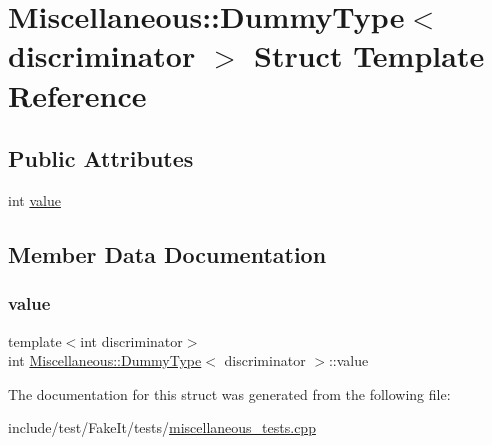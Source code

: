 \hypertarget{structMiscellaneous_1_1DummyType}{}\section{Miscellaneous\+::Dummy\+Type$<$ discriminator $>$ Struct Template Reference}
\label{structMiscellaneous_1_1DummyType}
\subsection*{Public Attributes}
\begin{DoxyCompactItemize}
\item 
int \mbox{\hyperlink{structMiscellaneous_1_1DummyType_abadeda432bdb5ea44d9ed76c57fd5096}{value}}
\end{DoxyCompactItemize}


\subsection{Member Data Documentation}
\mbox{\label{structMiscellaneous_1_1DummyType_abadeda432bdb5ea44d9ed76c57fd5096}} 
\subsubsection{\texorpdfstring{value}{value}}
{\footnotesize\ttfamily template$<$int discriminator$>$ \\
int \mbox{\hyperlink{structMiscellaneous_1_1DummyType}{Miscellaneous\+::\+Dummy\+Type}}$<$ discriminator $>$\+::value}



The documentation for this struct was generated from the following file\+:\begin{DoxyCompactItemize}
\item 
include/test/\+Fake\+It/tests/\mbox{\hyperlink{miscellaneous__tests_8cpp}{miscellaneous\+\_\+tests.\+cpp}}\end{DoxyCompactItemize}

